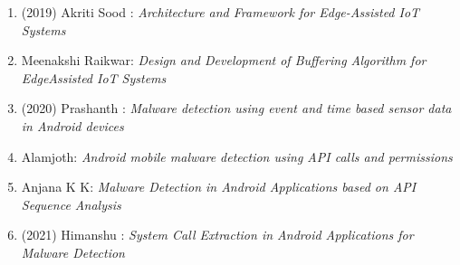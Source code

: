 \begin{enumerate}
\item	(2019) Akriti Sood	: 	\textit{Architecture and Framework for Edge-Assisted IoT Systems}
\item		Meenakshi Raikwar: 	\textit{Design and Development of Buffering Algorithm for EdgeAssisted IoT Systems}


\item	(2020) Prashanth	: 	\textit{Malware detection using event and time based sensor data in Android devices}
\item	       Alamjoth: 	\textit{Android mobile malware detection using API calls and permissions}
\item	       Anjana K K: 	\textit{Malware Detection in Android Applications based on API Sequence Analysis}


\item	(2021) Himanshu : \textit{System Call Extraction in Android Applications for Malware Detection}



	\end{enumerate}
